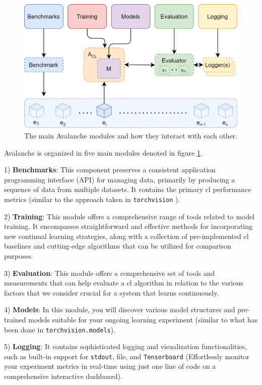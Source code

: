 \begin{figure}[H]
    \centering
    \includegraphics{Images//avalanche.png}
    \caption{The main Avalanche modules and how they interact with each other. \citep{avalancheContinualAIFiveMinutes} }
    \label{fig:avalanche}
\end{figure}
Avalanche is organized in five main modules denoted in figure \ref{fig:avalanche}. 

1) \textbf{Benchmarks}: This component preserves a consistent application programming interface (API) for managing data, primarily by producing a sequence of data from multiple datasets. It contains the primary \acrshort{cl} performance metrics (similar to the approach taken in \verb|torchvision| ).

2) \textbf{Training}: This module offers a comprehensive range of tools related to model training. It encompasses straightforward and effective methods for incorporating new continual learning strategies, along with a collection of pre-implemented \acrshort{cl} baselines and cutting-edge algorithms that can be utilized for comparison purposes.

3) \textbf{Evaluation}: This module offers a comprehensive set of tools and measurements that can help evaluate a \acrshort{cl} algorithm in relation to the various factors that we consider crucial for a system that learns continuously.

4) \textbf{Models}: In this module, you will discover various model structures and pre-trained models suitable for your ongoing learning experiment (similar to what has been done in \verb|torchvision.models|).

5) \textbf{Logging}: It contains sophisticated logging and visualization functionalities, such as built-in support for \verb|stdout|, file, and \verb|Tensorboard| (Effortlessly monitor your experiment metrics in real-time using just one line of code on a comprehensive interactive dashboard). 

